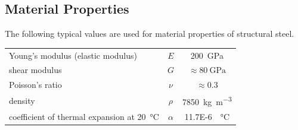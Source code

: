 \subsection{Material Properties}
The following typical values are used for material properties of structural steel.
\begin{table}[H]
\centering
\begin{tabular}{lcc}
	\toprule
	Young's modulus (elastic modulus)                     &   $E$    &      \SI{200}{\giga\pascal}      \\
	shear modulus                                         &   $G$    &  $\approx\SI{80}{\giga\pascal}$  \\
	Poisson's ratio                                       &  $\nu$   &        $\approx\num{0.3}$        \\
	density                                               &  $\rho$  & \SI{7850}{\kilogram\per\meter^3} \\
	coefficient of thermal expansion at \SI{20}{\celsius} & $\alpha$ &    \SI{11.7E-6}{\per\celsius}    \\ \bottomrule
\end{tabular}
\end{table}
